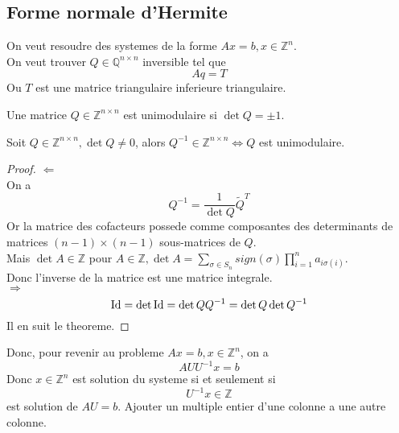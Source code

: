 \documentclass[../main.tex]{subfiles}
\begin{document}
\subsection{Forme normale d'Hermite}
On veut resoudre des systemes de la forme $Ax=b, x \in \mathbb{Z}^{n}$.\\
On veut trouver $Q \in \mathbb{Q}^{n \times n}$ inversible tel que
\[ 
Aq = T
\]
Ou $T$ est une matrice triangulaire inferieure triangulaire.
\begin{defn}
	Une matrice $Q \in \mathbb{Z}^{n\times n}$ est unimodulaire si $\det Q = \pm 1$.
	
\end{defn}
\begin{lemma}
Soit $Q \in \mathbb{Z}^{n\times n}, \det Q \neq 0$, alors $Q^{-1} \in \mathbb{Z}^{n\times n}\iff Q$ est unimodulaire.
\end{lemma}
\begin{proof}
$\Leftarrow$ \\
On a 
\[ 
Q^{-1} = \frac{1}{\det Q} \tilde Q^{T}
\]
Or la matrice des cofacteurs possede comme composantes des determinants de matrices $( n-1) \times ( n-1) $ sous-matrices de $Q $.\\
Mais $\det A \in \mathbb{Z}$ pour $A \in \mathbb{Z}, \det A = \sum_{\sigma \in S_n}^{ }sign( \sigma) \prod_{i=1} ^{n}a_{i\sigma( i) } $.\\
Donc l'inverse de la matrice est une matrice integrale.\\
$\Rightarrow$ \\
\[ 
\operatorname*{Id} = \det \operatorname*{Id} = \det Q Q^{-1} = \det Q \det Q^{-1}
\]
Il en suit le theoreme.
\end{proof}
Donc, pour revenir au probleme $Ax = b, x \in \mathbb{Z}^{n}$, on a 
\[ 
A U U^{-1}x = b
\]
Donc $x \in \mathbb{Z}^{n}$ est solution du systeme si et seulement si
\[ 
U^{-1}x \in \mathbb{Z}
\]
est solution de $AU = b$.
Ajouter un multiple entier d'une colonne a une autre colonne.
\end{document}
